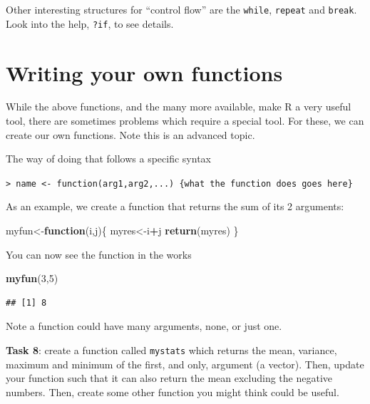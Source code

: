 \documentclass[
]{article}
\newenvironment{Shaded}{\begin{snugshade}}{\end{snugshade}}
\newcommand{\ControlFlowTok}[1]{\textcolor[rgb]{0.13,0.29,0.53}{\textbf{#1}}}
\newcommand{\DecValTok}[1]{\textcolor[rgb]{0.00,0.00,0.81}{#1}}
\newcommand{\FunctionTok}[1]{\textcolor[rgb]{0.13,0.29,0.53}{\textbf{#1}}}
\newcommand{\NormalTok}[1]{#1}
\newcommand{\OtherTok}[1]{\textcolor[rgb]{0.56,0.35,0.01}{#1}}
\newcommand{\SpecialCharTok}[1]{\textcolor[rgb]{0.81,0.36,0.00}{\textbf{#1}}}
\begin{document}
Other interesting structures for ``control flow'' are the
\texttt{while}, \texttt{repeat} and \texttt{break}. Look into the help,
\texttt{?if}, to see details.

\section{Writing your own functions}\label{writing-your-own-functions}

While the above functions, and the many more available, make R a very
useful tool, there are sometimes problems which require a special tool.
For these, we can create our own functions. Note this is an advanced
topic.

The way of doing that follows a specific syntax

\texttt{\textgreater{}\ name\ \textless{}-\ function(arg1,arg2,...)\ \{what\ the\ function\ does\ goes\ here\}}

As an example, we create a function that returns the sum of its 2
arguments:

\begin{Shaded}
\begin{Highlighting}[]
\NormalTok{myfun}\OtherTok{\textless{}{-}}\ControlFlowTok{function}\NormalTok{(i,j)\{}
\NormalTok{  myres}\OtherTok{\textless{}{-}}\NormalTok{i}\SpecialCharTok{+}\NormalTok{j}
  \FunctionTok{return}\NormalTok{(myres)}
\NormalTok{\}}
\end{Highlighting}
\end{Shaded}

You can now see the function in the works

\begin{Shaded}
\begin{Highlighting}[]
\FunctionTok{myfun}\NormalTok{(}\DecValTok{3}\NormalTok{,}\DecValTok{5}\NormalTok{)}
\end{Highlighting}
\end{Shaded}

\begin{verbatim}
## [1] 8
\end{verbatim}

Note a function could have many arguments, none, or just one.

\textbf{Task 8}: create a function called \texttt{mystats} which returns
the mean, variance, maximum and minimum of the first, and only, argument
(a vector). Then, update your function such that it can also return the
mean excluding the negative numbers. Then, create some other function
you might think could be useful.
\end{document}
